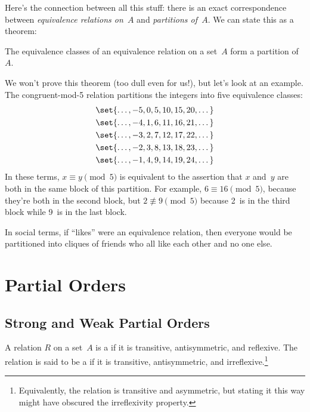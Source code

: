 Here's the connection between all this stuff: there is an exact
correspondence  between \emph{equivalence relations on~$A$} and
\emph{partitions of~$A$}.  We can state this as a theorem:

\begin{theorem}
The equivalence classes of an equivalence relation on a set~$A$ form a
partition of~$A$.
\end{theorem}

We won't prove this theorem (too dull even for us!), but let's look at
an example.  The congruent-mod-5 relation partitions the integers into
five equivalence classes:
\begin{gather*}
    \set{ \dots, -5, 0, 5, 10, 15, 20, \dots } \\
    \set{ \dots, -4, 1, 6, 11, 16, 21, \dots } \\
    \set{ \dots, -3, 2, 7, 12, 17, 22, \dots } \\
    \set{ \dots, -2, 3, 8, 13, 18, 23, \dots } \\
    \set{ \dots, -1, 4, 9, 14, 19, 24, \dots } \\
\end{gather*}
In these terms, $x \equiv y \pmod{5}$ is equivalent to the assertion
that $x$ and~$y$ are both in the same block of this partition.  For
example, $6 \equiv 16 \pmod{5}$, because they're both in the second
block, but $2 \nequiv 9 \pmod{5}$ because 2~is in the third block
while 9~is in the last block.

In social terms, if ``likes'' were an equivalence relation, then
everyone would be partitioned into cliques of friends who all like
each other and no one else.

\section{Partial Orders}\label{sec:partial_orders}

\subsection{Strong and Weak Partial Orders}

\begin{definition}\label{def:weak_po}

A relation $R$ on a set~$A$ is a  if it is
transitive, antisymmetric, and reflexive.  The relation is said to be
a  if it is transitive, antisymmetric, and
irreflexive.\footnote{Equivalently, the relation is transitive and
  asymmetric, but stating it this way might have obscured the
  irreflexivity property.}

\end{definition}

